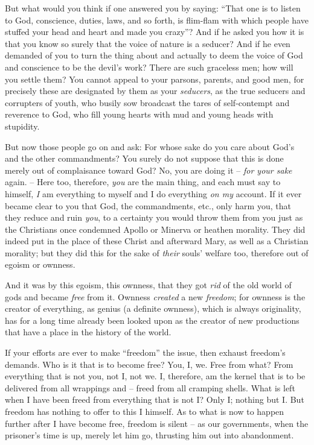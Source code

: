 \documentclass[12pt,a4paper]{book}
\begin{document}
But what would you think if one answered you by saying: ``That one is to 
listen to God, conscience, duties, laws, and so forth, is flim-flam with which 
people have stuffed your head and heart and made you crazy''? And if he asked 
you how it is that you know so surely that the voice of nature is a seducer? 
And if he even demanded of you to turn the thing about and actually to deem 
the voice of God and conscience to be the devil's work? There are such 
graceless men; how will you settle them? You cannot appeal to your parsons, 
parents, and good men, for precisely these are designated by them as your 
\textit{seducers}, as the true seducers and corrupters of youth, who busily 
sow broadcast the tares of self-contempt and reverence to God, who fill young 
hearts with mud and young heads with stupidity.

But now those people go on and ask: For whose sake do you care about God's and 
the other commandments? You surely do not suppose that this is done merely out 
of complaisance toward God? No, you are doing it -- \textit{for your sake} 
again. -- Here too, therefore, \textit{you} are the main thing, and each must 
say to himself, \textit{I} am everything to myself and I do everything 
\textit{on my} account. If it ever became clear to you that God, the 
commandments, etc., only harm you, that they reduce and ruin \textit{you}, to 
a certainty you would throw them from you just as the Christians once 
condemned Apollo or Minerva or heathen morality. They did indeed put in the 
place of these Christ and afterward Mary, as well as a Christian morality; but 
they did this for the sake of \textit{their} souls' welfare too, therefore out 
of egoism or ownness.

And it was by this egoism, this ownness, that they got \textit{rid} of the old 
world of gods and became \textit{free} from it. Ownness \textit{created} a new 
\textit{freedom}; for ownness is the creator of everything, as genius (a 
definite ownness), which is always originality, has for a long time already 
been looked upon as the creator of new productions that have a place in the 
history of the world.

If your efforts are ever to make ``freedom'' the issue, then exhaust 
freedom's demands. Who is it that is to become free? You, I, we. Free from 
what? From everything that is not you, not I, not we. I, therefore, am the 
kernel that is to be delivered from all wrappings and -- freed from all 
cramping shells. What is left when I have been freed from everything that is 
not I? Only I; nothing but I. But freedom has nothing to offer to this I 
himself. As to what is now to happen further after I have become free, freedom 
is silent -- as our governments, when the prisoner's time is up, merely let 
him go, thrusting him out into abandonment.
\end{document}
